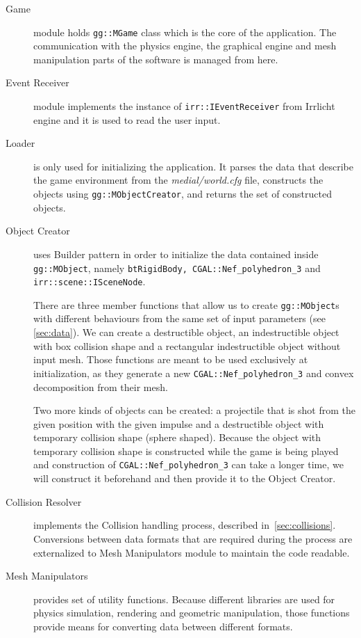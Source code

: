 \begin{description}

\item[Game] module holds {\tt gg::MGame} class which is the core of the application. The communication with the physics engine,  the graphical engine and mesh manipulation parts of the software is managed from here.

\item[Event Receiver] module implements the instance of {\tt irr::IEventReceiver} from Irrlicht engine and it is used to read the user input.

\item[Loader] is only used for initializing the application. It parses the data that describe the game environment from the \emph{medial/world.cfg} file, constructs the objects using {\tt gg::MObjectCreator}, and returns the set of constructed objects.

\item[Object Creator] uses Builder pattern in order to initialize the data contained inside {\tt gg::MObject}, namely {\tt btRigidBody, CGAL::Nef\_polyhedron\_3} and {\tt irr::scene::ISceneNode}.

There are three member functions that allow us to create {\tt gg::MObject}s  with different behaviours from the same set of input parameters (see \cref{sec:data}). We can create a destructible object, an indestructible object with box collision shape and a rectangular indestructible object without input mesh.  Those functions are meant to be used exclusively at initialization, as they generate a new {\tt CGAL::Nef\_polyhedron\_3} and convex decomposition from their mesh.

Two more kinds of objects can be created: a projectile that is shot from the given position with the given impulse and a destructible object with temporary collision shape (sphere shaped). Because the object with temporary collision shape is constructed while the game is being played and construction of {\tt CGAL::Nef\_polyhedron\_3} can take a longer time, we will construct it beforehand and then provide it to the Object Creator.

\item[Collision Resolver] implements the Collision handling process, described in~\cref{sec:collisions}. Conversions between data formats that are required during the process are externalized to Mesh Manipulators module to maintain the code readable.

\item[Mesh Manipulators] provides set of utility functions. Because different libraries are used for physics simulation, rendering and geometric manipulation, those functions provide means for converting data between different formats.
\end{description}

